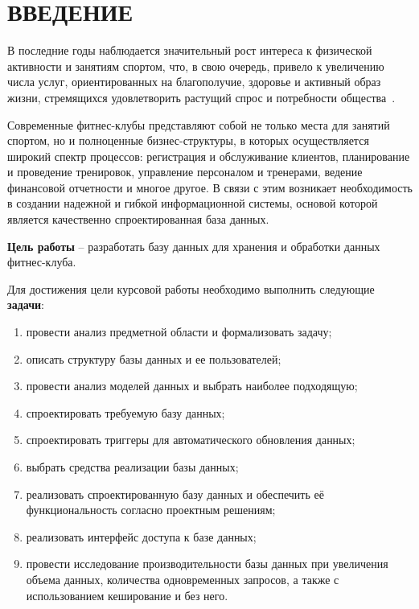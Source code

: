 \section*{ВВЕДЕНИЕ}

В последние годы наблюдается значительный рост интереса к физической активности и занятиям спортом, что, в свою очередь, привело к увеличению числа услуг, ориентированных на благополучие, здоровье и активный образ жизни, стремящихся удовлетворить растущий спрос и потребности общества~\cite{IHRSA2019}. 

Современные фитнес-клубы представляют собой не только места для занятий спортом, но и полноценные бизнес-структуры, в которых осуществляется широкий спектр процессов: регистрация и обслуживание клиентов, планирование и проведение тренировок, управление персоналом и тренерами, ведение финансовой отчетности и многое другое. В связи с этим возникает необходимость в создании надежной и гибкой информационной системы, основой которой является качественно спроектированная база данных.

\textbf{Цель работы} -- разработать базу данных для хранения и обработки данных фитнес-клуба. 

Для достижения цели курсовой работы необходимо выполнить следующие \textbf{задачи}: 

\begin{enumerate}[label=\arabic*)]
	\item провести анализ предметной области и формализовать задачу;
	\item описать структуру базы данных и ее пользователей;
	\item провести анализ моделей данных и выбрать наиболее подходящую;
	\item спроектировать требуемую базу данных;
	\item спроектировать триггеры для автоматического обновления данных;
	\item выбрать средства реализации базы данных;
	\item реализовать спроектированную базу данных и обеспечить её функциональность согласно проектным решениям;
	\item реализовать интерфейс доступа к базе данных;
	\item провести исследование производительности базы данных при увеличения объема данных, количества одновременных запросов, а также с использованием кеширование и без него.
\end{enumerate}

